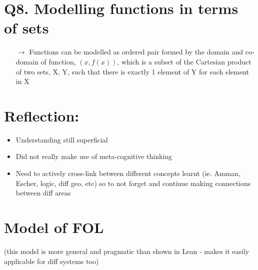 \documentclass{article}
\begin{document}
\section*{Q8. Modelling functions in terms of sets}
\begin{itemize}
  \item[$\rightarrow$] Functions can be modelled as ordered pair formed by the domain and co-domain of function, $(x, f(x))$, which is a subset of the Cartesian product of two sets, X, Y, such that there is exactly 1 element of Y for each element in X
\end{itemize}

\section*{Reflection:}
\begin{itemize}
  \item Understanding still superficial
  \item Did not really make use of meta-cognitive thinking
  \item Need to actively cross-link between different concepts learnt (ie. Amman, Escher, logic, diff geo, etc) so to not forget and continue making connections between diff areas
\end{itemize}

\pagebreak
\section*{Model of FOL}
(this model is more general and pragmatic than shown in Lean - makes it easily applicable for diff systems too)
\end{document}
